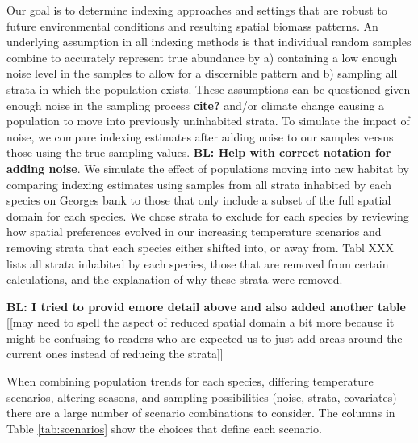 \documentclass[
  12pt,
]{article}
\begin{document}
Our goal is to determine indexing approaches and settings that are robust to future environmental conditions and resulting spatial biomass patterns. An underlying assumption in all indexing methods is that individual random samples combine to accurately represent true abundance by a) containing a low enough noise level in the samples to allow for a discernible pattern and b) sampling all strata in which the population exists. These assumptions can be questioned given enough noise in the sampling process \textbf{cite?} and/or climate change causing a population to move into previously uninhabited strata. To simulate the impact of noise, we compare indexing estimates after adding noise to our samples versus those using the true sampling values. \textbf{BL: Help with correct notation for adding noise}. We simulate the effect of populations moving into new habitat by comparing indexing estimates using samples from all strata inhabited by each species on Georges bank to those that only include a subset of the full spatial domain for each species. We chose strata to exclude for each species by reviewing how spatial preferences evolved in our increasing temperature scenarios and removing strata that each species either shifted into, or away from. Tabl XXX lists all strata inhabited by each species, those that are removed from certain calculations, and the explanation of why these strata were removed.

\textbf{BL: I tried to provid emore detail above and also added another table}
{[}{[}may need to spell the aspect of reduced spatial domain a bit more because it might be confusing to readers who are expected us to just add areas around the current ones instead of reducing the strata{]}{]}

When combining population trends for each species, differing temperature scenarios, altering seasons, and sampling possibilities (noise, strata, covariates) there are a large number of scenario combinations to consider. The columns in Table \ref{tab:scenarios} show the choices that define each scenario.

\begin{table}

\caption{\label{tab:scenarios}Each index estimate chooses one condition from each of the following
7 columns. There are 3*3*2*2*2*2*2 = 288 VAST model combinations and 3*3*2*2*2*2 = 144 stratified mean estimates.}
\centering
{}
\end{table}
\end{document}
